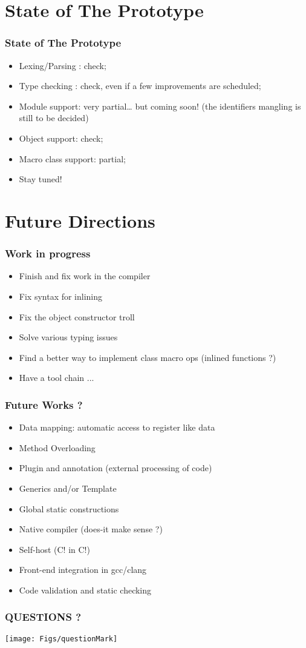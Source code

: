 \documentclass[pdftex]{beamer}
\begin{document}
\section{State of The Prototype}

\begin{frame}
  \frametitle{State of The Prototype}

  \pause

  \begin{itemize}
    \item Lexing/Parsing : check; \pause
    \item Type checking : check, even if a few improvements are scheduled;
      \pause
    \item Module support: very partial… but coming soon! (the identifiers
    mangling is still to be decided) \pause
    \item Object support: check; \pause
    \item Macro class support: partial; \pause
    \item Stay tuned!
  \end{itemize}
\end{frame}



\section{Future Directions}

\begin{frame}
  \frametitle{Work in progress}
  \begin{itemize}
  \item Finish and fix work in the compiler
  \item Fix syntax for inlining
  \item Fix the object constructor troll
  \item Solve various typing issues
  \item Find a better way to implement class macro ops (inlined
    functions ?)
  \item Have a tool chain ...
  \end{itemize}
\end{frame}

\begin{frame}
  \frametitle{Future Works ?}
  \begin{itemize}
  \item Data mapping: automatic access to register like data
  \item Method Overloading
  \item Plugin and annotation (external processing of code)
  \item Generics and/or Template
  \item Global static constructions
  \item Native compiler (does-it make sense ?)
  \item Self-host (C! in C!)
  \item Front-end integration in gcc/clang
  \item Code validation and static checking
  \end{itemize}
\end{frame}

\begin{frame}
  \frametitle{QUESTIONS ?}
  \begin{center}
    \texttt{[image: Figs/questionMark]}
  \end{center}
\end{frame}
\end{document}
